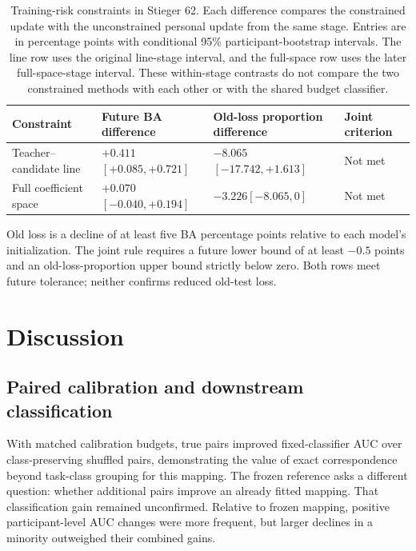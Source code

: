 \documentclass[11pt,a4paper]{article}
\begin{document}
\begin{table}[tbp]
\centering\small
\caption{Training-risk constraints in Stieger 62. Each difference compares the constrained update with the unconstrained personal update from the same stage. Entries are in percentage points with conditional 95\% participant-bootstrap intervals. The line row uses the original line-stage interval, and the full-space row uses the later full-space-stage interval. These within-stage contrasts do not compare the two constrained methods with each other or with the shared budget classifier.}
\label{tab:retention-primary}
\begin{tabularx}{\linewidth}{@{}>{\raggedright\arraybackslash}p{.19\linewidth}>{\raggedright\arraybackslash}X>{\raggedright\arraybackslash}X>{\raggedright\arraybackslash}p{.16\linewidth}@{}}
\toprule
Constraint & Future BA difference & Old-loss proportion difference & Joint criterion\\
\midrule
Teacher--candidate line & $+0.411$\newline $[+0.085,+0.721]$ & $-8.065$\newline $[-17.742,+1.613]$ & Not met\\
\addlinespace
Full coefficient space & $+0.070$\newline $[-0.040,+0.194]$ & $-3.226$\newline $[-8.065,0]$ & Not met\\
\bottomrule
\end{tabularx}
\par\smallskip
\begin{minipage}{\linewidth}\footnotesize\raggedright
Old loss is a decline of at least five BA percentage points relative to each model's initialization. The joint rule requires a future lower bound of at least $-0.5$ points and an old-loss-proportion upper bound strictly below zero. Both rows meet future tolerance; neither confirms reduced old-test loss.
\end{minipage}
\end{table}

\section{Discussion}

\subsection{Paired calibration and downstream classification}

With matched calibration budgets, true pairs improved fixed-classifier AUC over class-preserving shuffled pairs, demonstrating the value of exact correspondence beyond task-class grouping for this mapping. The frozen reference asks a different question: whether additional pairs improve an already fitted mapping. That classification gain remained unconfirmed. Relative to frozen mapping, positive participant-level AUC changes were more frequent, but larger declines in a minority outweighed their combined gains.
\end{document}
